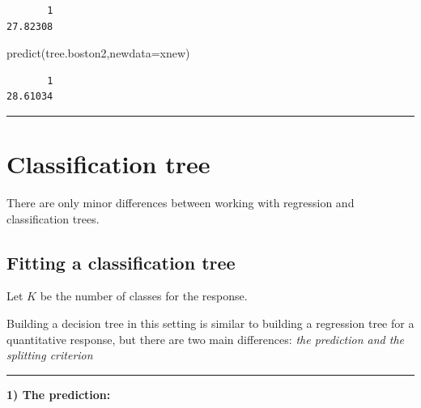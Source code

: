 \documentclass[
  letterpaper,
  DIV=11,
  numbers=noendperiod]{scrartcl}
\newenvironment{Shaded}{\begin{snugshade}}{\end{snugshade}}
\newcommand{\AttributeTok}[1]{\textcolor[rgb]{0.40,0.45,0.13}{#1}}
\newcommand{\FunctionTok}[1]{\textcolor[rgb]{0.28,0.35,0.67}{#1}}
\newcommand{\NormalTok}[1]{\textcolor[rgb]{0.00,0.23,0.31}{#1}}
\begin{document}
\begin{verbatim}
       1 
27.82308 
\end{verbatim}

\begin{Shaded}
\begin{Highlighting}[]
\FunctionTok{predict}\NormalTok{(tree.boston2,}\AttributeTok{newdata=}\NormalTok{xnew)}
\end{Highlighting}
\end{Shaded}

\begin{verbatim}
       1 
28.61034 
\end{verbatim}

\begin{center}\rule{0.5\linewidth}{0.5pt}\end{center}

\hypertarget{classification-tree}{%
\section{Classification tree}\label{classification-tree}}

There are only minor differences between working with regression and
classification trees.

\hypertarget{fitting-a-classification-tree}{%
\subsection{Fitting a classification
tree}\label{fitting-a-classification-tree}}

Let \(K\) be the number of classes for the response.

Building a decision tree in this setting is similar to building a
regression tree for a quantitative response, but there are two main
differences: \emph{the prediction and the splitting criterion}

\begin{center}\rule{0.5\linewidth}{0.5pt}\end{center}

\textbf{1) The prediction:}
\end{document}
